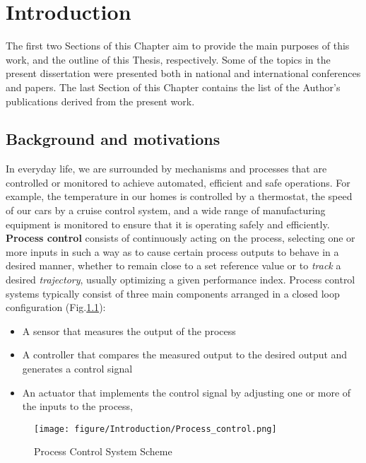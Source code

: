 \chapter{Introduction}
\newcommand{\LR}[1]{\textcolor{magenta}{#1}}

\label{cap:introduction}
The first two Sections of this Chapter aim to provide the main purposes of this work, and the outline of this Thesis, respectively. Some of the topics in the present dissertation were presented both in national and international conferences and papers. The last Section of this Chapter contains the list of the Author's publications derived from the present work. 
\section{Background and motivations}
In everyday life, we are surrounded by mechanisms and processes that are controlled or monitored to achieve automated, efficient and safe operations. For example, the temperature in our homes is controlled by a thermostat, the speed of our cars by a cruise control system, and a wide range of manufacturing equipment is monitored to ensure that it is operating safely and efficiently.\\
\textbf{Process control} consists of continuously acting on the process, selecting one or more inputs in such a way as to cause certain process outputs to behave in a desired manner, whether to remain close to a set reference value or to \textit{track} a desired \textit{trajectory}, usually optimizing a given performance index. Process control systems typically consist of three main components arranged in a closed loop configuration (Fig.\ref{fig:Control System}):
\begin{itemize}
    \item A sensor that measures the output of the process
    \item A controller that compares the measured output to the desired output and generates a control signal
    \item An actuator that implements the control signal by adjusting one or more of the inputs to the process,
  
\end{itemize}

\begin{figure}[ht!]
    \centering
    \texttt{[image: figure/Introduction/Process\_control.png]}
    \caption{Process Control System Scheme}
    \label{fig:Control System}
\end{figure}

